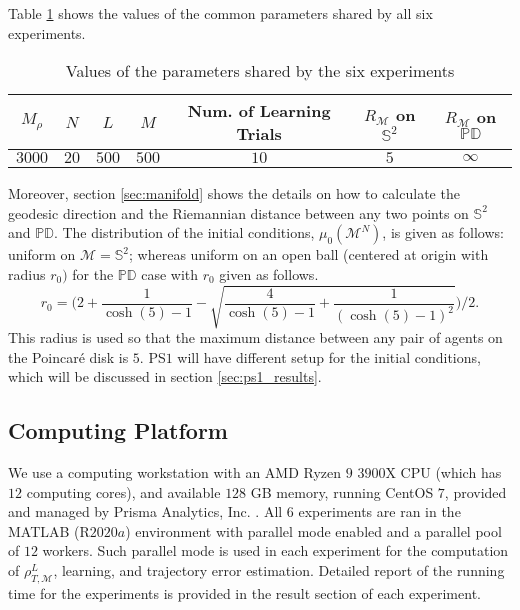 \documentclass[11pt]{article}
\newcommand{\mM}{\mathcal{M}}
\newcommand{\IR}{R_{\mM}}
\newcommand{\probIC}{\mu_0}
\newcommand{\muX}{\probIC(\mM^N)}
\begin{document}
Table \ref{tab:common_params} shows the values of the common parameters shared by all six experiments.
\begin{table}[H]
\centering
\small{
\small{\begin{tabular}{ c | c | c | c | c | c | c}
$M_{\rho}$ & $N$   & $L$  & $M$   & Num. of Learning Trials & $\IR$ on $\mathbb{S}^2$ & $\IR$ on $ \mathbb{PD} $ \\
\hline
$3000$     & $20$ & $500$ & $500$ & $10$                    & $5$            & $\infty$\\
\end{tabular}}  
}
\caption{Values of the parameters shared by the six experiments}
\label{tab:common_params} 
\end{table}
\noindent
Moreover, section \ref{sec:manifold} shows the details on how to calculate the geodesic direction and the Riemannian distance between any two points on $\mathbb{S}^2$ and $ \mathbb{PD} $.  The distribution of the initial conditions, $\muX$, is given as follows: uniform on $\mathcal{M}=\mathbb{S}^2$; whereas uniform on an open ball (centered at origin with radius $r_0)$ for the $ \mathbb{PD} $ case with $r_0$ given as follows.
\[
r_0 = \bigg(2 + \frac{1}{\cosh(5) - 1} - \sqrt{\frac{4}{\cosh(5) - 1} + \frac{1}{(\cosh(5) - 1)^2}}\bigg)/2.
\]
This radius is used so that the maximum distance between any pair of agents on the Poincar\'{e} disk is $5$.  PS$1$ will have different setup for the initial conditions, which will be discussed in section \ref{sec:ps1_results}.
%
\subsection{Computing Platform}
%
We use a computing workstation with an AMD Ryzen $9$ $3900$X CPU (which has $12$ computing cores), and available $128$ GB memory, running CentOS $7$, provided and managed by Prisma Analytics, Inc. .  
All $6$ experiments are ran in the MATLAB (R$2020a$) environment with parallel mode enabled and a parallel pool of $12$ workers.  Such parallel mode is used in each experiment for the computation of $\rho_{T, \mM}^L$, learning, and trajectory error estimation.  Detailed report of the running time for the experiments is provided in the result section of each experiment.
%
\end{document}
